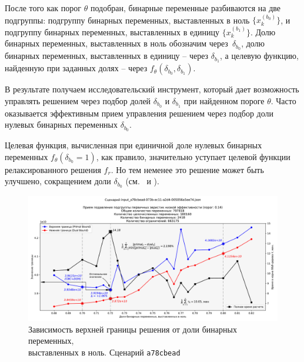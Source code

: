 \documentclass[%
	11pt,
	a4paper,
	utf8,
		]{article}
\begin{document}
После того как порог $ \theta $ подобран, бинарные переменные разбиваются на две подгруппы: подгруппу бинарных переменных, выставленных в ноль $ \{x_k^{(b_0)}\} $, и подгруппу бинарных переменных, выставленных в единицу $ \{ x_k^{(b_1)} \} $. Долю бинарных переменных, выставленных в ноль обозначим через~$ \delta_{b_0} $, долю бинарных переменных, выставленных в единицу -- через $ \delta_{b_1} $, а целевую функцию, найденную при заданных долях -- через $ f_{\theta}(\delta_{b_0}, \delta_{b_1}) $.

В результате получаем исследовательский инструмент, который дает возможность управлять решением через подбор долей $ \delta_{b_0} $ и $ \delta_{b_1} $ при найденном пороге $ \theta $. Часто оказывается эффективным прием управления решением через подбор доли нулевых бинарных переменных $ \delta_{b_0} $.

Целевая функция, вычисленная при единичной доле нулевых бинарных переменных $ f_{\theta}(\delta_{b_0}=1) $, как правило, значительно уступает целевой функции релаксированного решения $ f_r $. Но тем неменее это решение может быть улучшено, сокращением доли $ \delta_{b_0} $ (см.~ и ).

\begin{figure}[!h]
	\centering
	\includegraphics[scale=0.45]{figures/a78cbead_frac_bin_zeros.pdf}
	\caption{ Зависимость верхней границы решения от доли бинарных переменных, \\выставленных в ноль. Сценарий \texttt{a78cbead} }\label{fig:a78cbeadfracbinzeros}
\end{figure}
\end{document}
